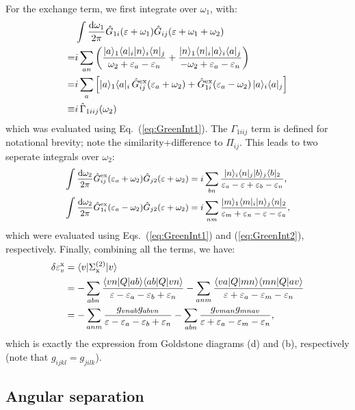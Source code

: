 \documentclass[10pt,twocolumn,a4paper]{article}%
\newcommand{\bra}[1]{\ensuremath{\langle #1|}}	%
\newcommand{\ket}[1]{\ensuremath{|#1\rangle}}	%
\def\d{\ensuremath{{\rm d}}}
\def\en{\ensuremath{\varepsilon}}
\newcommand{\w}{\ensuremath{\omega}}
\begin{document}
For the exchange term, we first integrate over $\w_1$, with:
\begin{align}
&\int\frac{\d\w_1}{2\pi}
\hat G_{1i}(\en+\w_1) \hat G_{ij}(\en+\w_1+\w_2) 
\notag\\
=& i\sum_{an}\left(
\frac{\ket{a}_1\bra{a}_i\ket{n}_i\bra{n}_j}{\w_2+\en_a-\en_n}+\frac{\ket{n}_1\bra{n}_i\ket{a}_i\bra{a}_j}{-\w_2+\en_a-\en_n}
\right)
\notag\\
\label{eq:ExchInt1}
= & i\sum_{a}\left[
\ket{a}_1\bra{a}_i \, \hat G^{\rm ex}_{ij}(\en_a+\w_2)+ \hat G^{\rm ex}_{1i}(\en_a-\w_2) \, \ket{a}_i\bra{a}_j 
\right]\\
\equiv & i \, \hat\Gamma_{1iij}(\w_2)
\label{eq:ExchInt1-Gamma}
\end{align}
which was evaluated using Eq.~(\ref{eq:GreenInt1}).
The $\Gamma_{1iij}$ term is defined for notational brevity; note the similarity+difference to $\Pi_{ij}$.
This leads to two seperate integrals over $\w_2$:\
\begin{align}
\small
\begin{split}
\int \frac{\d \w_2}{2\pi}\hat G^{\rm ex}_{ij}(\en_a+\w_2) \hat G_{j2}(\en+\omega_2)
&=
i\sum_{bn}
\frac{\ket{n}_i\bra{n}_j \ket{b}_j\bra{b}_2}{\en_a - \en + \en_b - \en_n},
\\
\int \frac{\d \w_2}{2\pi}\hat G^{\rm ex}_{1i}(\en_a-\w_2) \hat G_{j2}(\en+\omega_2)
&=
i\sum_{nm}
\frac{\ket{m}_1\bra{m}_i\ket{n}_j\bra{n}_2 }{\en_m + \en_n-\en - \en_a },
\end{split}
\end{align}
which were evaluated using Eqs.~(\ref{eq:GreenInt1}) and (\ref{eq:GreenInt2}), respectively.
%
Finally, combining all the terms, we have:
\begin{align}
\delta\en_v^{\rm x}&=\bra{v}\Sigma^{(2)}_{\rm x}\ket{v} \notag\\
&=-\sum_{abn}\frac{\bra{vn}Q\ket{ab} \bra{ab}Q\ket{vn}}{\en-\en_a-\en_b+\en_n}
-\sum_{anm}\frac{\bra{va}Q\ket{mn} \bra{mn}Q\ket{av}}{\en+\en_a-\en_m-\en_n} \notag\\
&=-\sum_{anm}\frac{g_{vnab}g_{abvn}}{\en-\en_a-\en_b+\en_n}
-\sum_{abn}\frac{g_{vman}g_{mnav}}{\en+\en_a-\en_m-\en_n},
\end{align}
which is exactly the expression from Goldstone diagrams (d) and (b), respectively (note that $g_{ijkl}=g_{jilk}$).




\subsection{Angular separation}
\end{document}
